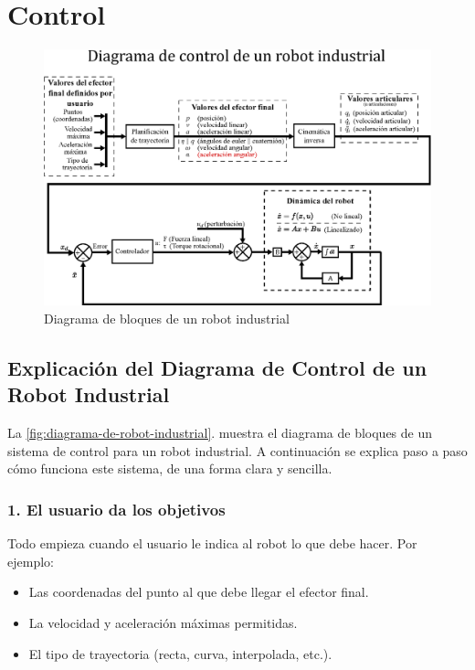 \section{Control}

\begin{figure}[h]
	\centering
	\includegraphics[width=\linewidth]{img/Diagrama_robot_industrial}
	\caption{Diagrama de bloques de un robot industrial}
	\label{fig:diagrama-de-robot-industrial}
\end{figure}

\subsection{Explicación del Diagrama de Control de un Robot Industrial}

La \autoref{fig:diagrama-de-robot-industrial}. muestra el diagrama de bloques de un sistema de control para un robot industrial. A continuación se explica paso a paso cómo funciona este sistema, de una forma clara y sencilla.

\subsubsection{1. El usuario da los objetivos}

Todo empieza cuando el usuario le indica al robot lo que debe hacer. Por ejemplo:
\begin{itemize}
	\item Las coordenadas del punto al que debe llegar el efector final.
	\item La velocidad y aceleración máximas permitidas.
	\item El tipo de trayectoria (recta, curva, interpolada, etc.).
\end{itemize}

